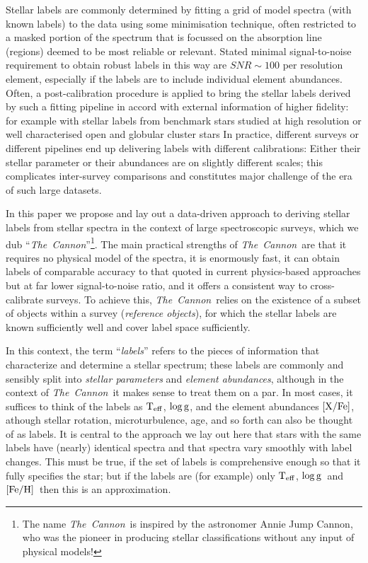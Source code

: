 \documentclass[12pt, preprint]{aastex}
\newcommand{\tc}{\textsl{The~Cannon}}
\newcommand{\teff}{\mbox{$\rm T_{eff}$}}
\newcommand{\feh}{\mbox{$\rm [Fe/H]$}}
\newcommand{\xfe}{\mbox{$\rm [X/Fe]$}}
\newcommand{\logg}{\mbox{$\rm \log g$}}
\begin{document}
Stellar labels are commonly determined by fitting a grid of model spectra (with known labels) to the data using some minimisation technique, often restricted to a masked portion of the spectrum that is focussed on the absorption line (regions) deemed to be most reliable or relevant. 
Stated minimal signal-to-noise requirement to obtain robust labels in this way are $SNR\sim 100$ per resolution element, especially if the labels are to include individual element abundances. 
Often, a post-calibration procedure is applied to bring the stellar labels derived by such a fitting pipeline in accord with external information of higher fidelity: for example with stellar labels from benchmark stars studied at high resolution or well characterised open and globular cluster stars \citep[e.g.,][]{Meszaros2013, Freeman2013}
In practice, different surveys or different pipelines end up delivering labels with different calibrations:
Either their stellar parameter or their abundances are on slightly different scales; this complicates
inter-survey comparisons and constitutes major challenge of the era of such large datasets. 

In this paper we propose and lay out a data-driven approach to deriving stellar labels from stellar spectra in the context of large spectroscopic surveys,
which we dub ``\tc''\footnote{The name \tc\ is inspired by the astronomer Annie Jump Cannon,
who was the pioneer in producing stellar classifications without any input of physical models!}.
The main practical strengths of \tc\ are that it requires no physical model of the spectra, it is enormously fast, it can obtain labels of comparable accuracy to that quoted in current physics-based approaches
 but at far lower signal-to-noise ratio, and it offers a consistent way to cross-calibrate surveys. 
To achieve this, \tc\ relies on the existence of a subset of objects within a survey
(\textit{reference objects}), for which the stellar labels are known sufficiently well and cover label space sufficiently.

In this context, the term ``\emph{labels}'' refers to the pieces of information
that characterize and determine a stellar spectrum; these labels are commonly and sensibly split into \emph{stellar parameters} and \emph{element abundances}, although in the context of \tc\ it makes sense to treat them on a par. 
In most cases, it suffices to think of the labels as \teff , \logg, and the element abundances \xfe, athough stellar rotation, microturbulence, age, and so forth can also be thought of as labels.
It is central to the approach we lay out here that stars with the same labels have (nearly) identical spectra and that spectra vary smoothly with label changes. 
This must be true, if the set of labels is comprehensive enough so that it fully specifies the star; but if the labels are (for example) only \teff, \logg\ and \feh\ then this is an approximation.
\end{document}

